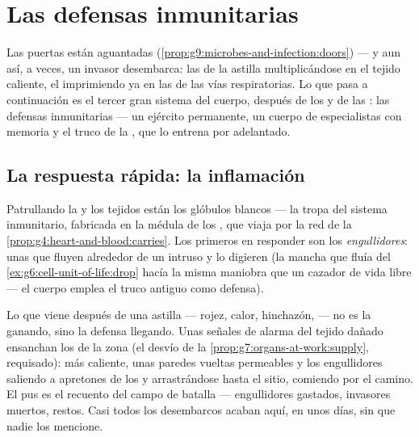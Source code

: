 \chapter{Las defensas inmunitarias}\label{ch:g9:immune-defenses}

Las puertas están aguantadas
(\cref{prop:g9:microbes-and-infection:doors}) --- y aun así, a veces,
un invasor desembarca: las  de la astilla multiplicándose en
el tejido caliente, el  imprimiendo ya en las  de las vías
respiratorias. Lo que pasa a continuación es el tercer gran sistema del
cuerpo, después de los  y de las : las defensas
inmunitarias --- un ejército permanente, un cuerpo de especialistas con
memoria y el truco de la , que lo entrena por adelantado.

\section{La respuesta rápida: la inflamación}

\begin{definition}\label{def:g9:immune-defenses:standing}
Patrullando la  y los tejidos están los glóbulos
blancos --- la tropa del sistema inmunitario,
fabricada en la médula de los , que viaja por la red de la
\cref{prop:g4:heart-and-blood:carries}. Los primeros en responder son
los \emph{engullidores}: unas  que fluyen alrededor de un
intruso y lo digieren (la mancha que fluía del
\cref{ex:g6:cell-unit-of-life:drop} hacía la misma maniobra que un
cazador de vida libre --- el cuerpo emplea el truco antiguo como
defensa).
\end{definition}

\begin{proposition}\label{prop:g9:immune-defenses:inflammation}
Lo que viene después de una astilla --- rojez, calor, hinchazón, 
--- no es la  ganando, sino la defensa llegando. Unas señales
de alarma del tejido dañado ensanchan los  de la zona (el desvío
de la \cref{prop:g7:organs-at-work:supply}, requisado): más 
caliente, unas paredes vueltas permeables y los engullidores saliendo a
apretones de los  y arrastrándose hasta el sitio, comiendo
 por el camino. El pus es el recuento del campo de batalla ---
engullidores gastados, invasores muertos, restos. Casi todos los
desembarcos acaban aquí, en unos días, sin que nadie los mencione.
\end{proposition}
\admitted

